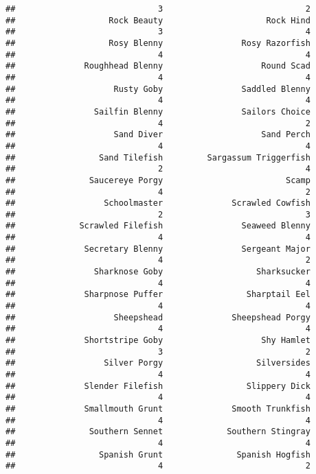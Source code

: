 \documentclass[
]{article}
\begin{document}
\begin{verbatim}
##                             3                             2 
##                   Rock Beauty                     Rock Hind 
##                             3                             4 
##                   Rosy Blenny                Rosy Razorfish 
##                             4                             4 
##              Roughhead Blenny                    Round Scad 
##                             4                             4 
##                    Rusty Goby                Saddled Blenny 
##                             4                             4 
##                Sailfin Blenny                Sailors Choice 
##                             4                             2 
##                    Sand Diver                    Sand Perch 
##                             4                             4 
##                 Sand Tilefish         Sargassum Triggerfish 
##                             2                             4 
##               Saucereye Porgy                         Scamp 
##                             4                             2 
##                  Schoolmaster              Scrawled Cowfish 
##                             2                             3 
##             Scrawled Filefish                Seaweed Blenny 
##                             4                             4 
##              Secretary Blenny                Sergeant Major 
##                             4                             2 
##                Sharknose Goby                   Sharksucker 
##                             4                             4 
##              Sharpnose Puffer                 Sharptail Eel 
##                             4                             4 
##                    Sheepshead              Sheepshead Porgy 
##                             4                             4 
##              Shortstripe Goby                    Shy Hamlet 
##                             3                             2 
##                  Silver Porgy                   Silversides 
##                             4                             4 
##              Slender Filefish                 Slippery Dick 
##                             4                             4 
##              Smallmouth Grunt              Smooth Trunkfish 
##                             4                             4 
##               Southern Sennet             Southern Stingray 
##                             4                             4 
##                 Spanish Grunt               Spanish Hogfish 
##                             4                             2 

\end{verbatim}
\end{document}
